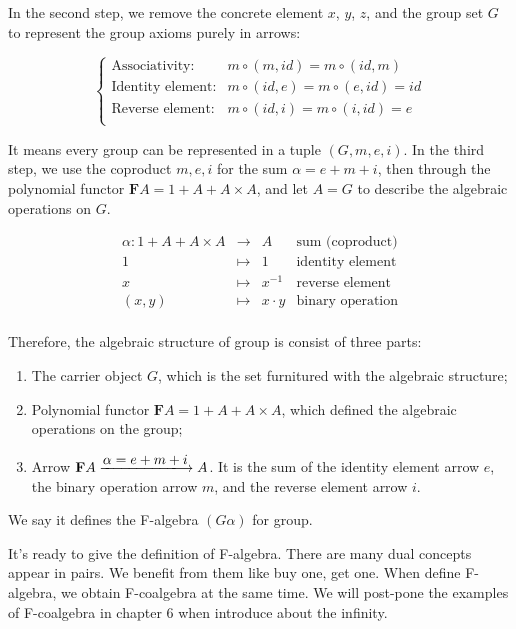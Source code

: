 \documentclass{article}
\begin{document}
\begin{example}
In the second step, we remove the concrete element $x$, $y$, $z$, and the group set $G$ to represent the group axioms purely in arrows:

\[
\begin{cases}
\text{Associativity:} & m \circ (m, id) = m \circ (id, m) \\
\text{Identity element:} & m \circ (id, e) = m \circ (e, id) = id \\
\text{Reverse element:} & m \circ (id, i) = m \circ (i, id) = e \\
\end{cases}
\]

It means every group can be represented in a tuple $(G, m, e, i)$. In the third step, we use the coproduct $m, e, i$ for the sum $\alpha = e + m + i$, then through the polynomial functor $\mathbf{F} A = 1 + A + A \times A$, and let $A = G$ to describe the algebraic operations on $G$.

\[
\begin{array}{rcll}
\alpha : 1 + A + A \times A & \longrightarrow & A & \text{sum (coproduct)}\\
1 & \longmapsto & 1 & \text{identity element}  \\
x & \longmapsto & x^{-1} & \text{reverse element} \\
(x, y) & \longmapsto & x \cdot y & \text{binary operation} \\
\end{array}
\]

Therefore, the algebraic structure of group is consist of three parts:

\begin{enumerate}
  \item The carrier object $G$, which is the set furnitured with the algebraic structure;
  \item Polynomial functor $\mathbf{F} A = 1 + A + A \times A$, which defined the algebraic operations on the group;
  \item Arrow $\mathbf{F} A \arrowto{\alpha = e + m + i} A$. It is the sum of the identity element arrow $e$, the binary operation arrow $m$, and the reverse element arrow $i$.
\end{enumerate}

We say it defines the F-algebra $(G \alpha)$ for group.
\end{example}

 
It's ready to give the definition of F-algebra. There are many dual concepts appear in pairs. We benefit from them like buy one, get one. When define F-algebra, we obtain F-coalgebra at the same time. We will post-pone the examples of F-coalgebra in chapter 6 when introduce about the infinity.
\end{document}
